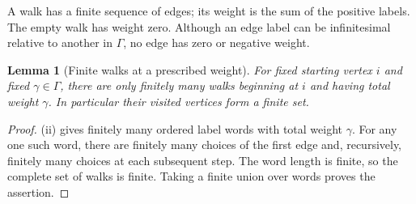 \documentclass[11pt,a4paper]{article}
\numberwithin{equation}{section}
\newtheorem{lemma}[lemma]{Lemma}
\theoremstyle{definition}
\theoremstyle{remark}
\begin{document}
A walk has a finite sequence of edges; its weight is the sum of the positive
labels. The empty walk has weight zero. Although an edge label can be
infinitesimal relative to another in $\Gamma$, no edge has zero or negative
weight.

\begin{lemma}[Finite walks at a prescribed weight]\label{ihs:rf:lem:finitewalks}
For fixed starting vertex $i$ and fixed $\gamma\in\Gamma$, there are only
finitely many walks beginning at $i$ and having total weight $\gamma$. In
particular their visited vertices form a finite set.
\end{lemma}
\begin{proof}
(ii) gives finitely many ordered label words with
total weight $\gamma$. For any one such word, there are finitely many
choices of the first edge and, recursively, finitely many choices at each
subsequent step. The word length is finite, so the complete set of walks is
finite. Taking a finite union over words proves the assertion.
\end{proof}
\end{document}
